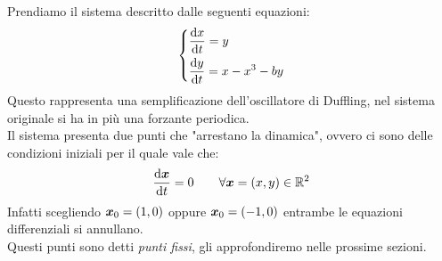 \noindent
\begin{exmp}
    Prendiamo il sistema descritto dalle seguenti equazioni:
    \[\begin{dcases}
        \frac{\text{d} x}{\text{d} t} = y \\
	\frac{\text{d} y}{\text{d} t} = x - x^3 - b y
    \end{dcases}\] 
    Questo rappresenta una semplificazione dell'oscillatore di Duffling, nel sistema originale si ha in più una forzante periodica.\\
    Il sistema presenta due punti che "arrestano la dinamica", ovvero ci sono delle condizioni iniziali per il quale vale che:
    \[
	\frac{\text{d} \boldsymbol{x}}{\text{d} t} = 0 \qquad \forall \boldsymbol{x}  = (x, y) \in \mathbb{R}^2
    \] 
    Infatti scegliendo $\boldsymbol{x}_0 = (1, 0)$ oppure $\boldsymbol{x}_0 = (-1, 0)$ entrambe le equazioni differenziali si annullano.\\
    Questi punti sono detti \textit{punti fissi}, gli approfondiremo nelle prossime sezioni.
\end{exmp}
\noindent
